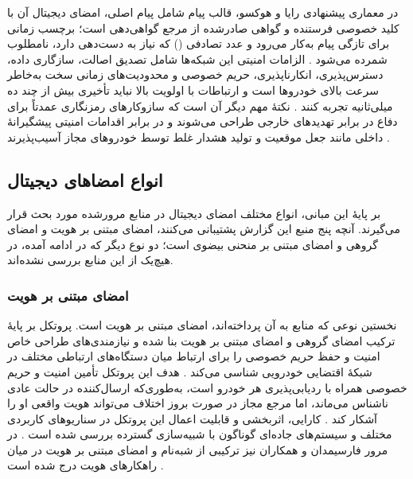 \documentclass[12pt,a4paper]{article}
\begin{document}
در معماری پیشنهادی رایا و هوکسو، قالب پیام شامل پیام اصلی، امضای دیجیتال آن با کلید خصوصی فرستنده و گواهی صادرشده از مرجع گواهی‌دهی است؛ برچسب زمانی برای تازگی پیام به‌کار می‌رود و عدد تصادفی () که نیاز به دست‌دهی دارد، نامطلوب شمرده می‌شود \cite{SecuringVehicularAd}. الزامات امنیتی این شبکه‌ها شامل تصدیق اصالت، سازگاری داده، دسترس‌پذیری، انکارناپذیری، حریم خصوصی و محدودیت‌های زمانی سخت به‌خاطر سرعت بالای خودرو‌ها است \cite{SecuringVehicularAd} و ارتباطات با اولویت بالا نباید تأخیری بیش از چند ده میلی‌ثانیه تجربه کنند \cite{farsimadanReviewSecurityChallenges2025}. نکتهٔ مهم دیگر آن است که سازوکار‌های رمزنگاری عمدتاً برای دفاع در برابر تهدید‌های خارجی طراحی می‌شوند و در برابر اقدامات امنیتی پیشگیرانهٔ داخلی مانند جعل موقعیت و تولید هشدار غلط توسط خودرو‌های مجاز آسیب‌پذیرند \cite{farsimadanReviewSecurityChallenges2025}.

\subsection{انواع امضا‌های دیجیتال}

بر پایهٔ این مبانی، انواع مختلف امضای دیجیتال در منابع مرورشده مورد بحث قرار می‌گیرند. آنچه پنج منبع این گزارش پشتیبانی می‌کنند، امضای مبتنی بر هویت و امضای گروهی و امضای مبتنی بر منحنی بیضوی است؛ دو نوع دیگر که در ادامه آمده، در هیچ‌یک از این منابع بررسی نشده‌اند.

\subsubsection{امضای مبتنی بر هویت}

نخستین نوعی که منابع به آن پرداخته‌اند، امضای مبتنی بر هویت است. پروتکل  بر پایهٔ ترکیب امضای گروهی و امضای مبتنی بر هویت بنا شده و نیازمندی‌های طراحی خاص امنیت و حفظ حریم خصوصی را برای ارتباط میان دستگاه‌های ارتباطی مختلف در شبکهٔ اقتضایی خودرویی شناسی می‌کند \cite{linGSISSecurePrivacyPreserving2007}. هدف این پروتکل تأمین امنیت و حریم خصوصی همراه با ردیابی‌پذیری هر خودرو است، به‌طوری‌که ارسال‌کننده در حالت عادی ناشناس می‌ماند، اما مرجع مجاز در صورت بروز اختلاف می‌تواند هویت واقعی او را آشکار کند \cite{linGSISSecurePrivacyPreserving2007}. کارایی، اثربخشی و قابلیت اعمال این پروتکل در سناریو‌های کاربردی مختلف و سیستم‌های جاده‌ای گوناگون با شبیه‌سازی گسترده بررسی شده است \cite{linGSISSecurePrivacyPreserving2007}. در مرور فارسیمدان و همکاران نیز ترکیبی از شبه‌نام و امضای مبتنی بر هویت در میان راهکار‌های هویت درج شده است \cite{farsimadanReviewSecurityChallenges2025}.
\end{document}
